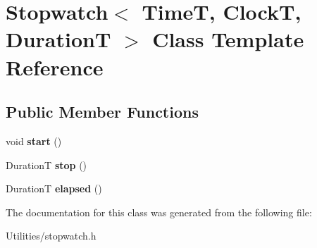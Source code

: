 \hypertarget{classStopwatch}{}\section{Stopwatch$<$ TimeT, ClockT, DurationT $>$ Class Template Reference}
\label{classStopwatch}
\subsection*{Public Member Functions}
\begin{DoxyCompactItemize}
\item 
void {\bfseries start} ()\hypertarget{classStopwatch_a9e2f8235b8ff4047283dab800d3099fa}{}\label{classStopwatch_a9e2f8235b8ff4047283dab800d3099fa}

\item 
DurationT {\bfseries stop} ()\hypertarget{classStopwatch_a9a935a68524f7768c990eab9090e96ba}{}\label{classStopwatch_a9a935a68524f7768c990eab9090e96ba}

\item 
DurationT {\bfseries elapsed} ()\hypertarget{classStopwatch_a4dc9e5e83bcb010caaacffb98f29674a}{}\label{classStopwatch_a4dc9e5e83bcb010caaacffb98f29674a}

\end{DoxyCompactItemize}


The documentation for this class was generated from the following file\+:\begin{DoxyCompactItemize}
\item 
Utilities/stopwatch.\+h\end{DoxyCompactItemize}
